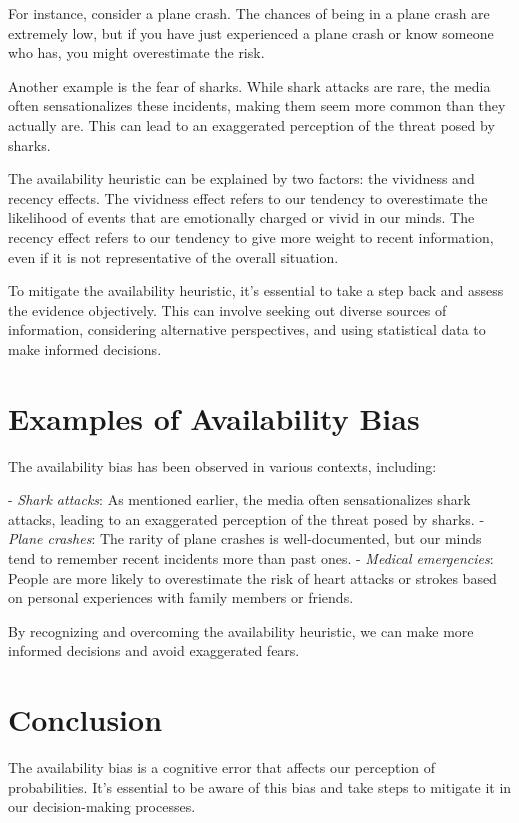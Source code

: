 \documentclass{report}%
\begin{document}
For instance, consider a plane crash. The chances of being in a plane crash are extremely low, but if you have just experienced a plane crash or know someone who has, you might overestimate the risk.

Another example is the fear of sharks. While shark attacks are rare, the media often sensationalizes these incidents, making them seem more common than they actually are. This can lead to an exaggerated perception of the threat posed by sharks.

The availability heuristic can be explained by two factors: the vividness and recency effects. The vividness effect refers to our tendency to overestimate the likelihood of events that are emotionally charged or vivid in our minds. The recency effect refers to our tendency to give more weight to recent information, even if it is not representative of the overall situation.

To mitigate the availability heuristic, it's essential to take a step back and assess the evidence objectively. This can involve seeking out diverse sources of information, considering alternative perspectives, and using statistical data to make informed decisions.

\section{Examples of Availability Bias}

The availability bias has been observed in various contexts, including:

- \emph{Shark attacks}: As mentioned earlier, the media often sensationalizes shark attacks, leading to an exaggerated perception of the threat posed by sharks.
- \emph{Plane crashes}: The rarity of plane crashes is well-documented, but our minds tend to remember recent incidents more than past ones.
- \emph{Medical emergencies}: People are more likely to overestimate the risk of heart attacks or strokes based on personal experiences with family members or friends.

By recognizing and overcoming the availability heuristic, we can make more informed decisions and avoid exaggerated fears.

\section{Conclusion}

The availability bias is a cognitive error that affects our perception of probabilities. It's essential to be aware of this bias and take steps to mitigate it in our decision-making processes.
%
\end{document}
